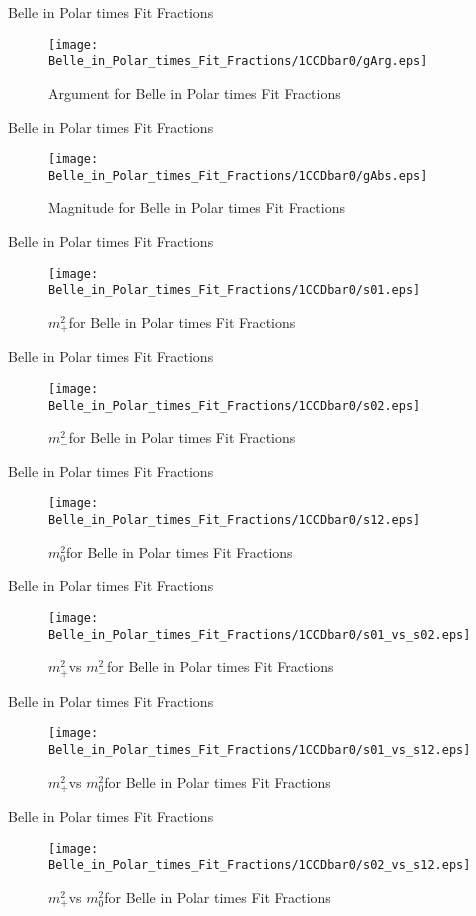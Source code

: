 \documentclass{beamer}
\newcommand{\MP}{\ensuremath{m^2_+}}
\newcommand{\MM}{\ensuremath{m^2_-}}
\newcommand{\MZ}{\ensuremath{m^2_0}}
\begin{document}
\begin{frame}{Belle in Polar times Fit Fractions}
\begin{figure}
\texttt{[image: Belle\_in\_Polar\_times\_Fit\_Fractions/1CCDbar0/gArg.eps]}
\caption{Argument for Belle in Polar times Fit Fractions}
\end{figure}
\end{frame}
\begin{frame}{Belle in Polar times Fit Fractions}
\begin{figure}
\texttt{[image: Belle\_in\_Polar\_times\_Fit\_Fractions/1CCDbar0/gAbs.eps]}
\caption{Magnitude for Belle in Polar times Fit Fractions}
\end{figure}
\end{frame}
\begin{frame}{Belle in Polar times Fit Fractions}
\begin{figure}
\texttt{[image: Belle\_in\_Polar\_times\_Fit\_Fractions/1CCDbar0/s01.eps]}
\caption{\MP for Belle in Polar times Fit Fractions}
\end{figure}
\end{frame}
\begin{frame}{Belle in Polar times Fit Fractions}
\begin{figure}
\texttt{[image: Belle\_in\_Polar\_times\_Fit\_Fractions/1CCDbar0/s02.eps]}
\caption{\MM for Belle in Polar times Fit Fractions}
\end{figure}
\end{frame}
\begin{frame}{Belle in Polar times Fit Fractions}
\begin{figure}
\texttt{[image: Belle\_in\_Polar\_times\_Fit\_Fractions/1CCDbar0/s12.eps]}
\caption{\MZ for Belle in Polar times Fit Fractions}
\end{figure}
\end{frame}
\begin{frame}{Belle in Polar times Fit Fractions}
\begin{figure}
\texttt{[image: Belle\_in\_Polar\_times\_Fit\_Fractions/1CCDbar0/s01\_vs\_s02.eps]}
\caption{\MP vs \MM for Belle in Polar times Fit Fractions}
\end{figure}
\end{frame}
\begin{frame}{Belle in Polar times Fit Fractions}
\begin{figure}
\texttt{[image: Belle\_in\_Polar\_times\_Fit\_Fractions/1CCDbar0/s01\_vs\_s12.eps]}
\caption{\MP vs \MZ for Belle in Polar times Fit Fractions}
\end{figure}
\end{frame}
\begin{frame}{Belle in Polar times Fit Fractions}
\begin{figure}
\texttt{[image: Belle\_in\_Polar\_times\_Fit\_Fractions/1CCDbar0/s02\_vs\_s12.eps]}
\caption{\MP vs \MZ for Belle in Polar times Fit Fractions}
\end{figure}
\end{frame}
\end{document}
